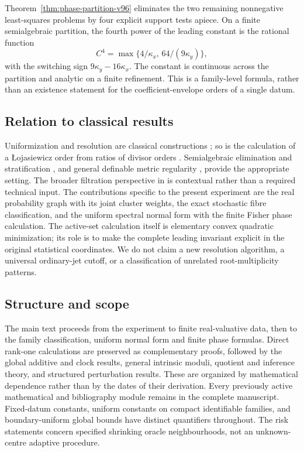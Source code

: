 Theorem~\ref{thm:phase-partition-v96} eliminates the two remaining
nonnegative least-squares problems by four explicit support tests
apiece. On a finite semialgebraic partition, the fourth power of the
leading constant is the rational function
\[
 C^4=\max\{4/\kappa_x,\,64/(9\kappa_y)\},
\]
with the switching sign $9\kappa_y-16\kappa_x$. The constant is
continuous across the partition and analytic on a finite refinement.
This is a family-level formula, rather than an existence statement
for the coefficient-envelope orders of a single datum.

\subsection*{Relation to classical results}
Uniformization and resolution are classical constructions
\cite{v95BM88,v95BM97}; so is the calculation of a
\L{}ojasiewicz order from ratios of divisor orders
\cite{v95BE09}. Semialgebraic elimination and stratification
\cite{BCR98,BPR06}, and general definable metric regularity
\cite{v95LP20}, provide the appropriate setting. The broader
filtration perspective in \cite{v95Ha26} is contextual rather than a
required technical input. The contributions specific to the present
experiment are the real probability graph with its joint cluster
weights, the exact stochastic fibre classification, and the uniform
spectral normal form with the finite Fisher phase calculation.
The active-set calculation itself is elementary convex quadratic
minimization; its role is to make the complete leading invariant
explicit in the original statistical coordinates. We do not claim a
new resolution algorithm, a universal ordinary-jet cutoff, or a
classification of unrelated root-multiplicity patterns.

\subsection*{Structure and scope}
The main text proceeds from the experiment to finite real-valuative
data, then to the family classification, uniform normal form and
finite phase formulas. Direct rank-one calculations are preserved as
complementary proofs, followed by the global additive and clock
results, general intrinsic moduli, quotient and inference theory,
and structured perturbation results. These are organized by
mathematical dependence rather than by the dates of their derivation.
Every previously active mathematical and bibliography module remains
in the complete manuscript. Fixed-datum constants, uniform constants
on compact identifiable families, and boundary-uniform global bounds
have distinct quantifiers throughout. The risk statements concern
specified shrinking oracle neighbourhoods, not an unknown-centre
adaptive procedure.

